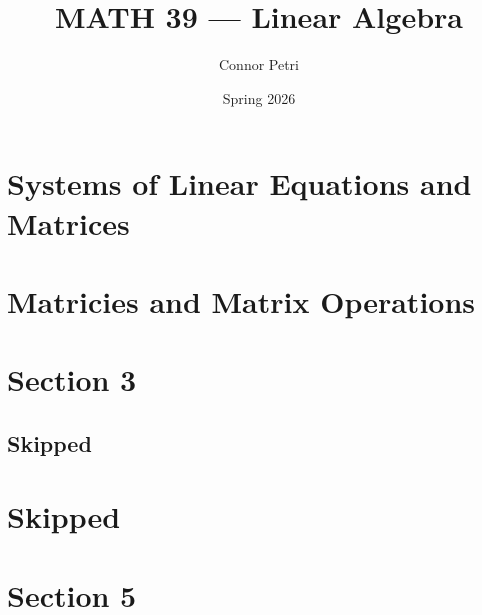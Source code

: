 \documentclass[12pt, letterpaper]{article}
\title{MATH 39 --- Linear Algebra}
\author{Connor Petri}
\date{Spring 2026}
\begin{document}
\maketitle
\pagebreak
\tableofcontents
\pagebreak

\section{Systems of Linear Equations and Matrices}

\pagebreak

\pagebreak

\pagebreak


\section{Matricies and Matrix Operations}

\pagebreak

\pagebreak

\pagebreak

\pagebreak

\pagebreak

\section{Section 3}
\subsection{Skipped}

\pagebreak

\pagebreak

\pagebreak

\section{Skipped}
\pagebreak

\section{Section 5}

\pagebreak

\pagebreak

\pagebreak

\pagebreak
\end{document}
